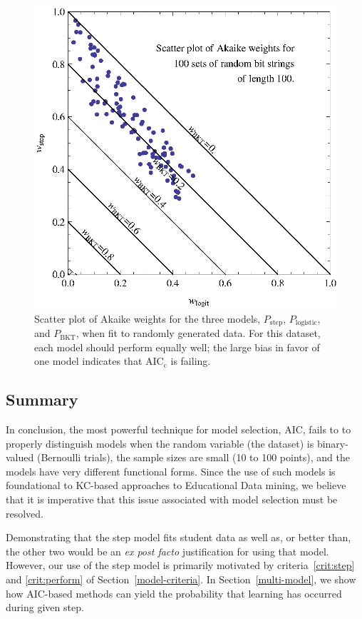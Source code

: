\documentclass{acmlarge-edm}
\begin{document}
\begin{figure}
  \centering \includegraphics{scatter-random-weights.eps}
  \caption{Scatter plot of Akaike weights for the three models, 
   $P_\mathrm{step}$, $P_\mathrm{logistic}$, and $P_\mathrm{BKT}$, 
   when fit to randomly generated data.  For this dataset, each 
   model should perform
   equally well; the large bias in favor of one model indicates
   that  AIC$_\mathrm{c}$ is failing.}\label{scatter2}
\end{figure}

\subsection{Summary}

In conclusion, the most powerful technique for model selection,
AIC, fails to to properly distinguish models when the random
variable (the dataset) is binary-valued (Bernoulli trials),
the sample sizes are small (10 to 100 points), and the models
have very different functional forms.  Since the use of such
models is foundational to KC-based approaches to Educational
Data mining, we believe that it is imperative that this issue 
associated with model selection must be resolved.

Demonstrating that the step model fits student data as well as,
or better than, the other two would be an
{\em ex post facto} justification for using that model.  
However, our use of the step model is primarily motivated
by criteria~\ref{crit:step} and \ref{crit:perform} of 
Section~\ref{model-criteria}.
In Section~\ref{multi-model}, we show how AIC-based methods
can yield the probability that learning has occurred during given step.
\end{document}
